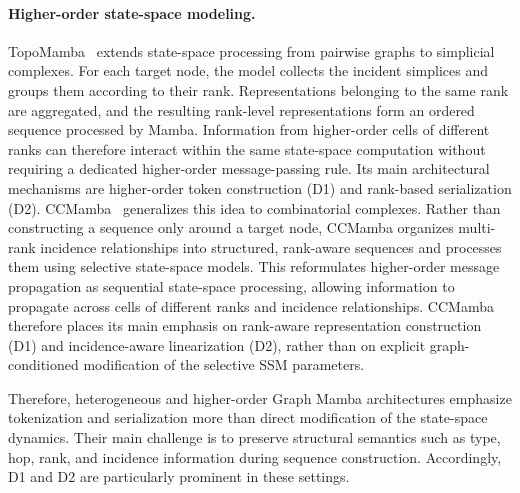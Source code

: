 \documentclass[acmsmall]{acmart}
\begin{document}
\paragraph{\textbf{Higher-order state-space modeling.}}
TopoMamba~\cite{montagna2024topological} extends state-space processing from
pairwise graphs to simplicial complexes. For each target node, the model
collects the incident simplices and groups them according to their rank.
Representations belonging to the same rank are aggregated, and the resulting
rank-level representations form an ordered sequence processed by Mamba.
Information from higher-order cells of different ranks can therefore interact
within the same state-space computation without requiring a dedicated
higher-order message-passing rule. Its main architectural mechanisms are
higher-order token construction (D1) and rank-based serialization (D2).
CCMamba~\cite{chen2026ccmamba} generalizes this idea to combinatorial
complexes. Rather than constructing a sequence only around a target node,
CCMamba organizes multi-rank incidence relationships into structured,
rank-aware sequences and processes them using selective state-space models.
This reformulates higher-order message propagation as sequential state-space
processing, allowing information to propagate across cells of different ranks
and incidence relationships. CCMamba therefore places its main emphasis on
rank-aware representation construction (D1) and incidence-aware
linearization (D2), rather than on explicit graph-conditioned modification of
the selective SSM parameters.

Therefore, heterogeneous and higher-order Graph Mamba architectures emphasize tokenization and serialization more than direct modification of the state-space dynamics. Their main challenge is to preserve structural semantics such as type, hop, rank, and incidence information during sequence construction. Accordingly, D1 and D2 are particularly prominent in these settings.
\end{document}
